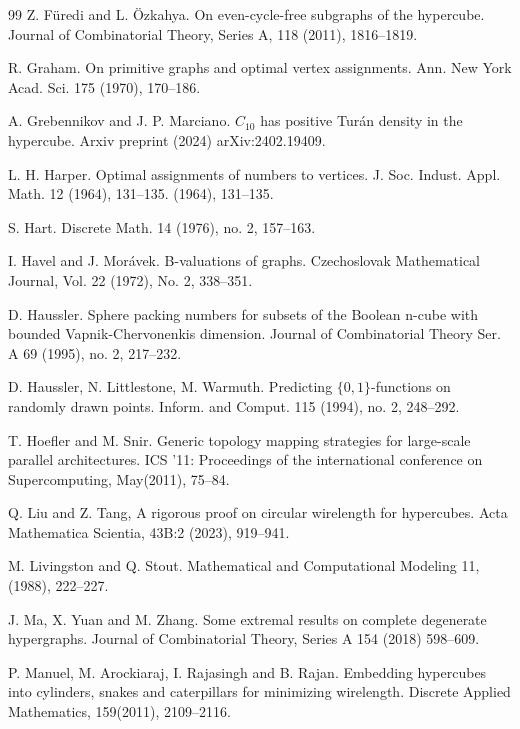 \documentclass[11pt, a4paper]{article}
\begin{document}
\begin{thebibliography}{99}
Z. F\"uredi and L. \"{O}zkahya.
\newblock On even-cycle-free subgraphs of the hypercube.
Journal of Combinatorial Theory, Series A, 118 (2011), 1816--1819.


R. Graham.
On primitive graphs and optimal vertex assignments.
Ann. New York Acad. Sci. 175 (1970), 170--186.


 A. Grebennikov and J. P. Marciano. $C_{10}$ has positive Tur\'an density in the hypercube. Arxiv preprint (2024) arXiv:2402.19409.


  L. H. Harper. Optimal assignments of numbers to vertices.  J. Soc. Indust. Appl. Math. 12 (1964), 131–135. (1964), 131--135.


  S. Hart. 
Discrete Math. 14 (1976), no. 2, 157--163.


 I. Havel and J. Mor\'avek.
\newblock B-valuations of graphs.
Czechoslovak Mathematical Journal, Vol. 22 (1972), No. 2, 338--351.

 D. Haussler.
Sphere packing numbers for subsets of the Boolean n-cube with bounded Vapnik-Chervonenkis dimension. 
Journal of  Combinatorial  Theory Ser. A 69 (1995), no. 2, 217--232.

  D. Haussler, N.  Littlestone, M. Warmuth. Predicting $\{0,1\}$-functions on randomly drawn points. Inform. and Comput. 115 (1994), no. 2, 248--292.


  T. Hoefler and M. Snir.  Generic topology mapping strategies for large-scale parallel architectures. ICS '11: Proceedings of the international conference on Supercomputing, May(2011), 75--84. 



  Q. Liu and Z. Tang, A rigorous proof on circular wirelength for hypercubes.  Acta Mathematica Scientia, 43B:2 (2023), 919--941.

M. Livingston and Q. Stout.
Mathematical and Computational Modeling 11, (1988), 222--227.



 J. Ma, X. Yuan and M. Zhang. 
\newblock Some extremal results on complete degenerate hypergraphs.
 Journal of Combinatorial Theory, Series A 154 (2018) 598--609.



  P. Manuel, M. Arockiaraj, I. Rajasingh and  B. Rajan. Embedding hypercubes into cylinders, snakes and caterpillars for minimizing wirelength. Discrete Applied Mathematics, 159(2011), 2109--2116.


\end{thebibliography}
\end{document}
